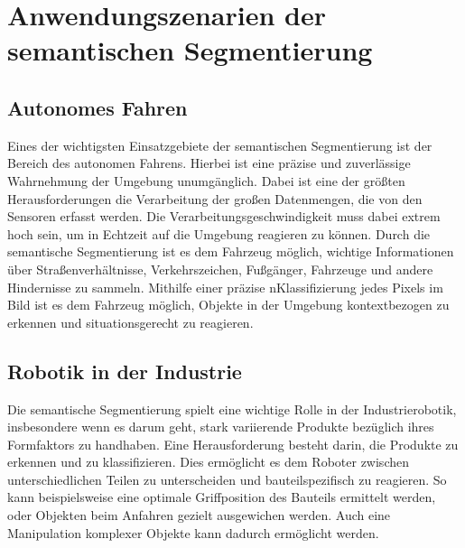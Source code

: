 \chapter{Anwendungszenarien der semantischen Segmentierung}
\section{Autonomes Fahren}
Eines der wichtigsten Einsatzgebiete der semantischen Segmentierung ist der
Bereich des autonomen Fahrens. Hierbei ist eine präzise und zuverlässige
Wahrnehmung der Umgebung unumgänglich. Dabei ist eine der größten
Herausforderungen die Verarbeitung der großen Datenmengen, die von den Sensoren
erfasst werden. Die Verarbeitungsgeschwindigkeit muss dabei extrem hoch sein,
um in Echtzeit auf die Umgebung reagieren zu können. Durch die semantische
Segmentierung ist es dem Fahrzeug möglich, wichtige Informationen über
Straßenverhältnisse, Verkehrszeichen, Fußgänger, Fahrzeuge und andere
Hindernisse zu sammeln. Mithilfe einer präzise nKlassifizierung jedes Pixels im
Bild ist es dem Fahrzeug möglich, Objekte in der Umgebung kontextbezogen zu
erkennen und situationsgerecht zu reagieren.\cite{9000872}

\section{Robotik in der Industrie}

Die semantische Segmentierung spielt eine wichtige Rolle in der
Industrierobotik, insbesondere wenn es darum geht, stark variierende Produkte
bezüglich ihres Formfaktors zu handhaben. Eine Herausforderung besteht darin,
die Produkte zu erkennen und zu klassifizieren. Dies ermöglicht es dem Roboter
zwischen unterschiedlichen Teilen zu unterscheiden und bauteilspezifisch zu
reagieren. So kann beispielsweise eine optimale Griffposition des Bauteils
ermittelt werden, oder Objekten beim Anfahren gezielt ausgewichen werden. Auch
eine Manipulation komplexer Objekte kann dadurch ermöglicht werden. \cite{liu2020real}

